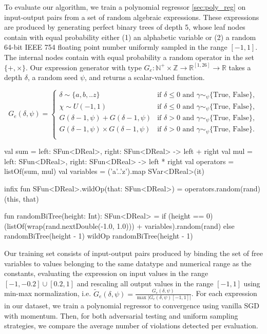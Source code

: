 To evaluate our algorithm, we train a polynomial regressor \autoref{sec:poly_reg} on input-output pairs from a set of random algebraic expressions. These expressions are produced by generating perfect binary trees of depth 5, whose leaf nodes contain with equal probability either (1) an alphabetic variable or (2) a random 64-bit IEEE 754 floating point number uniformly sampled in the range $[-1, 1]$. The internal nodes contain with equal probability a random operator in the set $\{+, \times\}$. Our expression generator with type $G_e: \mathbb{N}^+\times\mathbb{Z} \rightarrow \mathbb{R}^{[1, 26]} \rightarrow \mathbb{R}$ takes a depth $\delta$, a random seed $\psi$, and returns a scalar-valued function.

\begin{equation}\label{eq:btree_gen}
G_e(\delta, \psi) = \begin{cases}
\delta\sim\{a,b,..z\} & \text{if } \delta \leq 0 \text{ and } \gamma\sim_\psi\{\text{True, False}\},\\
\chi\sim U(-1, 1) & \text{if } \delta \leq 0 \text{ and } \gamma\sim_\psi\{\text{True, False}\},\\
G(\delta-1, \psi) + G(\delta-1, \psi) & \text{if } \delta > 0 \text{ and } \gamma\sim_\psi\{\text{True, False}\},\\
G(\delta-1, \psi) \times G(\delta-1, \psi) & \text{if } \delta > 0 \text{ and } \gamma\sim_\psi\{\text{True, False}\}.\\
\end{cases}
\end{equation}

\begin{kotlinlisting}
val sum = { left: SFun<DReal>, right: SFun<DReal> -> left + right }
val mul = { left: SFun<DReal>, right: SFun<DReal> -> left * right }
val operators = listOf(sum, mul)
val variables = ('a'..'z').map { SVar<DReal>(it) }

infix fun SFun<DReal>.wildOp(that: SFun<DReal>) = operators.random(rand)(this, that)

fun randomBiTree(height: Int): SFun<DReal> =
  if (height == 0) (listOf(wrap(rand.nextDouble(-1.0, 1.0))) + variables).random(rand)
  else randomBiTree(height - 1) wildOp randomBiTree(height - 1)
\end{kotlinlisting}

Our training set consists of input-output pairs produced by binding the set of free variables to values belonging to the same datatype and numerical range as the constants, evaluating the expression on input values in the range $[-1, -0.2] \cup [0.2, 1]$ and rescaling all output values in the range $[-1, 1]$ using min-max normalization, i.e. $\tilde{G}_e(\delta, \psi)= \frac{G_e(\delta, \psi)}{\max |G_e(\delta, \psi)[-1, 1]|}$. For each expression in our dataset, we train a polynomial regressor to convergence using vanilla SGD with momentum. Then, for both adversarial testing and uniform sampling strategies, we compare the average number of violations detected per evaluation.

